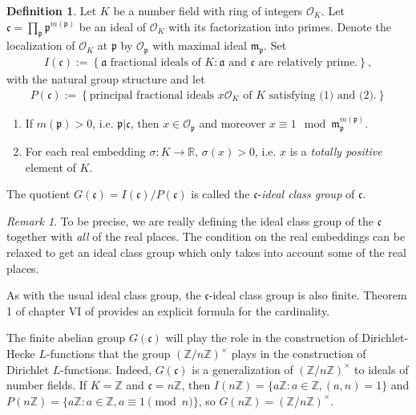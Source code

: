 \documentclass[12pt]{amsart}
\theoremstyle{definition}
\newtheorem{definition}[thm]{Definition}
\theoremstyle{remark}
\newtheorem{remark}[thm]{Remark}
\numberwithin{equation}{section}
\newcommand{\cO}{\mathcal O}
\newcommand{\fka}{\mathfrak a}
\newcommand{\fkc}{\mathfrak c}
\newcommand{\fkm}{\mathfrak m}
\newcommand{\fkp}{\mathfrak p}
\newcommand{\bbR}{\mathbb R}
\newcommand{\bbZ}{\mathbb Z}
\begin{document}
\begin{definition} \label{def:cIdealClassGroup}
Let $K$ be a number field with ring of integers $\cO_{K}$. Let $\fkc = \prod_{\fkp} \fkp^{m(\fkp)}$  be an ideal of $\cO_{K}$ with its factorization into primes. Denote the localization of $\cO_{K}$ at $\fkp$ by $\cO_{\fkp}$ with maximal ideal $\fkm_{\fkp}$.
Set
\begin{align}
I(\fkc) := \left\{\fka \text{ fractional ideals of } K: \fka \text{ and } \fkc \text{ are relatively prime.} \right\}, 
\end{align}
with the natural group structure and let
\begin{align}
P(\fkc) := \left\{\text{principal fractional ideals }x\cO_{K} \text{ of $K$ satisfying (1) and (2).}\right\} 
\end{align}
\begin{enumerate}
\item If $m(\fkp) > 0$, i.e. $\fkp|\fkc$, then $x \in \cO_{\fkp}$ and moreover $x \equiv 1 \mod \fkm_{\fkp}^{m(\fkp)}$.
\item For each real embedding $\sigma: K \to \bbR$, $\sigma(x) > 0$, i.e. $x$ is a \emph{totally positive} element of $K$.
\end{enumerate}
The quotient $G(\fkc) = I(\fkc)/P(\fkc)$ is called the $\fkc$-\emph{ideal class group} of $\fkc$.
\end{definition}

\begin{remark}
To be precise, we are really defining the ideal class group of the $\fkc$ together with \emph{all} of the real places. The condition on the real embeddings can be relaxed to get an ideal class group which only takes into account some of the real places.
\end{remark}

As with the usual ideal class group, the $\fkc$-ideal class group is also finite. Theorem 1 of chapter VI of \cite{Lang86} provides an explicit formula for the cardinality.

The finite abelian group $G(\fkc)$ will play the role in the construction of Dirichlet-Hecke $L$-functions that the group $(\bbZ/n\bbZ)^{\times}$ plays in the construction of Dirichlet $L$-functions. Indeed, $G(\fkc)$ is a generalization of $(\bbZ/n\bbZ)^{\times}$ to ideals of number fields. If $K = \bbZ$ and $\fkc = n\bbZ$, then $I(n\bbZ) = \{a\bbZ: a \in \bbZ, (a,n) = 1\}$ and $P(n\bbZ) = \{a \bbZ: a \in \bbZ, a \equiv 1 \pmod{n}\}$, so $G(n\bbZ) = (\bbZ/n\bbZ)^{\times}$.
\end{document}

